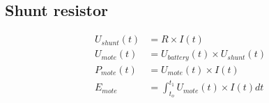 \subsection{Shunt resistor}

\begin{align*}
  U_{shunt}(t) &= R \times I(t) \\
  U_{mote}(t) &= U_{battery}(t) \times U_{shunt}(t) \\
  P_{mote} (t) &= U_{mote}(t) \times I(t) \\
  E_{mote} &= \int_{t_o}^{t_1} U_{mote}(t) \times I(t) dt
\end{align*}

